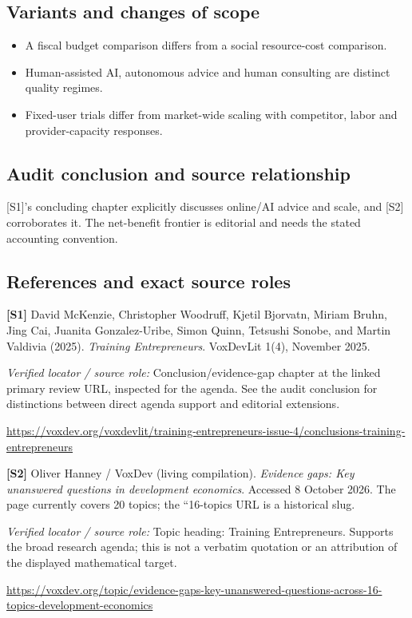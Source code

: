 \documentclass[11pt,a4paper]{article}
\begin{document}
\subsection*{Variants and changes of scope}

\begin{itemize}
\item A fiscal budget comparison differs from a social resource-cost comparison.
\item Human-assisted AI, autonomous advice and human consulting are distinct quality regimes.
\item Fixed-user trials differ from market-wide scaling with competitor, labor and provider-capacity responses.
\end{itemize}

\subsection*{Audit conclusion and source relationship}

[S1]'s concluding chapter explicitly discusses online/AI advice and scale, and [S2] corroborates it. The net-benefit frontier is editorial and needs the stated accounting convention.

\subsection*{References and exact source roles}

{\footnotesize\raggedright
\par\noindent\textbf{[S1]} David McKenzie, Christopher Woodruff, Kjetil Bjorvatn, Miriam Bruhn, Jing Cai, Juanita Gonzalez-Uribe, Simon Quinn, Tetsushi Sonobe, and Martin Valdivia (2025). \emph{Training Entrepreneurs}. VoxDevLit 1(4), November 2025.\par \textit{Verified locator / source role:} Conclusion/evidence-gap chapter at the linked primary review URL, inspected for the agenda. See the audit conclusion for distinctions between direct agenda support and editorial extensions.\par \url{https://voxdev.org/voxdevlit/training-entrepreneurs-issue-4/conclusions-training-entrepreneurs}\par\smallskip
\par\noindent\textbf{[S2]} Oliver Hanney / VoxDev (living compilation). \emph{Evidence gaps: Key unanswered questions in development economics}. Accessed 8 October 2026. The page currently covers 20 topics; the ``16-topics URL is a historical slug.\par \textit{Verified locator / source role:} Topic heading: Training Entrepreneurs. Supports the broad research agenda; this is not a verbatim quotation or an attribution of the displayed mathematical target.\par \url{https://voxdev.org/topic/evidence-gaps-key-unanswered-questions-across-16-topics-development-economics}\par\smallskip
}
\end{document}
